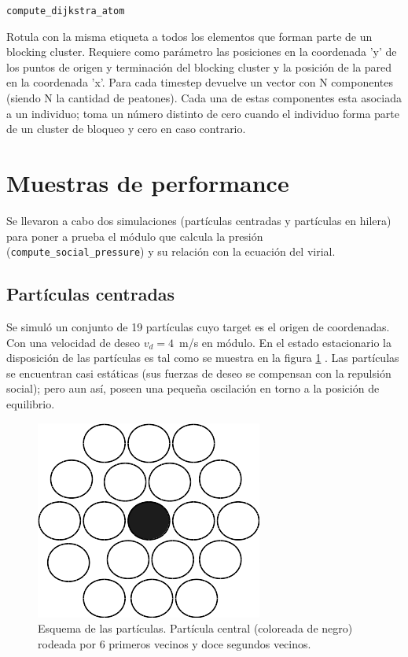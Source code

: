 {\Large \tt {compute\_dijkstra\_atom}}

Rotula con la misma etiqueta a todos los elementos que forman parte de un blocking cluster. Requiere como parámetro las posiciones en la coordenada 'y' de los puntos de origen y terminación del blocking cluster y la posición de la pared en la coordenada 'x'. Para cada timestep devuelve un vector con N componentes (siendo N la cantidad de peatones). Cada una de estas componentes esta asociada a un individuo; toma un número distinto de cero cuando el individuo forma parte de un cluster de bloqueo y cero en caso contrario.

\section{\label{Muestras de performace} Muestras de performance} 

Se llevaron a cabo dos simulaciones (partículas centradas y partículas en hilera) para poner a prueba el módulo que calcula la presión ({\tt compute\_social\_pressure}) y su relación con la ecuación del virial. \\ 

\subsection{Partículas centradas}

Se simuló un conjunto de 19 partículas cuyo target es el origen de coordenadas. Con una velocidad de deseo $v_d=4$~m/s en módulo. En el estado estacionario la disposición de las partículas es tal como se muestra en la figura \ref{central} . Las partículas se encuentran casi estáticas (sus fuerzas de deseo se compensan con la repulsión social); pero aun así, poseen una pequeña oscilación en torno a la posición de equilibrio. 

\begin{figure}[H]
    \centering
        \includegraphics[scale=0.5]{figuras/central.png}
    \caption[width=5cm]{Esquema de las partículas. Partícula central (coloreada de negro) rodeada por 6 primeros vecinos y doce segundos vecinos.}
    \label{central}
\end{figure}


